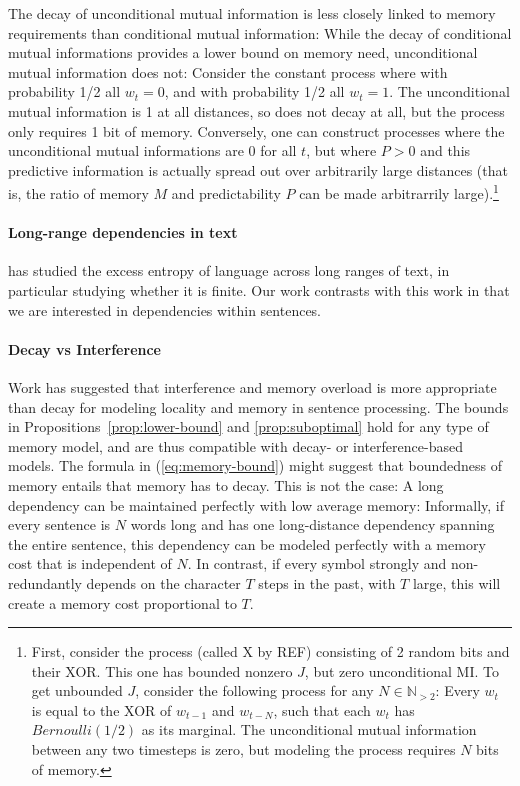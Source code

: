 The decay of unconditional mutual information is less closely linked to memory requirements than conditional mutual information:
While the decay of conditional mutual informations provides a lower bound on memory need, unconditional mutual information does not:
Consider the constant process where with probability 1/2 all $w_t = 0$, and with probability 1/2 all $w_t = 1$. %
The unconditional mutual information is 1 at all distances, so does not decay at all, but the process only requires 1 bit of memory.
Conversely, one can construct processes where the unconditional mutual informations are 0 for all $t$, but where $P > 0$ and this predictive information is actually spread out over arbitrarily large distances (that is, the ratio of memory $M$ and predictability $P$ can be made arbitrarrily large).\footnote{First, consider the process (called X by REF) consisting of 2 random bits and their XOR. This one has bounded nonzero $J$, but zero unconditional MI. To get unbounded $J$, consider the following process for any $N \in \mathbb{N}_{>2}$: Every $w_t$ is equal to the XOR of $w_{t-1}$ and $w_{t-N}$, such that each $w_t$ has $Bernoulli(1/2)$ as its marginal. The unconditional mutual information between any two timesteps is zero, but modeling the process requires $N$ bits of memory.}



\paragraph{Long-range dependencies in text}    %
\cite{debowski-excess-2011} has studied the excess entropy of language across long ranges of text, in particular studying whether it is finite. %
Our work contrasts with this work in that we are interested in dependencies within sentences.


\paragraph{Decay vs Interference}
Work has suggested that interference and memory overload is more appropriate than decay \cite[p. 408]{lewis-activation-based-2005} for modeling locality and memory in sentence processing.
The bounds in Propositions~\ref{prop:lower-bound} and \ref{prop:suboptimal} hold for any type of memory model, and are thus compatible with decay- or interference-based models.
The formula in (\ref{eq:memory-bound}) might suggest that boundedness of memory entails that memory has to decay.
This is not the case:
A long dependency can be maintained perfectly with low average memory:
Informally, if every sentence is $N$ words long and has one long-distance dependency spanning the entire sentence, this dependency can be modeled perfectly with a memory cost that is independent of $N$.
In contrast, if every symbol strongly and non-redundantly depends on the character $T$ steps in the past, with $T$ large, this will create a memory cost proportional to $T$.




